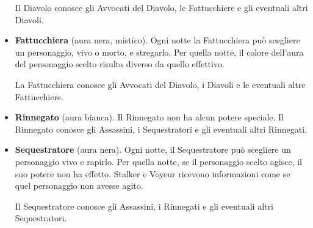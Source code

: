 \documentclass[a4paper,10pt]{article}
\begin{document}
\begin{itemize}
 Il Diavolo conosce gli Avvocati del Diavolo, le Fattucchiere e gli eventuali altri Diavoli.
 
 \item {\bf Fattucchiera} (aura nera, mistico). Ogni notte la Fattucchiera può scegliere un personaggio, vivo o morto, e stregarlo. Per quella notte, il colore dell'aura del personaggio scelto risulta diverso da quello effettivo.
 
 
 La Fattucchiera conosce gli Avvocati del Diavolo, i Diavoli e le eventuali altre Fattucchiere.
  
 \item {\bf Rinnegato} (aura bianca). Il Rinnegato non ha alcun potere speciale. Il Rinnegato conosce gli Assassini, i Sequestratori e gli eventuali altri Rinnegati.

 \item {\bf Sequestratore} (aura nera). Ogni notte, il Sequestratore può scegliere un personaggio vivo e rapirlo. Per quella notte, se il personaggio scelto agisce, il suo potere non ha effetto. Stalker e Voyeur ricevono informazioni come se quel personaggio non avesse agito.
 
 
 Il Sequestratore conosce gli Assassini, i Rinnegati e gli eventuali altri Sequestratori.


\end{itemize}
\end{document}
